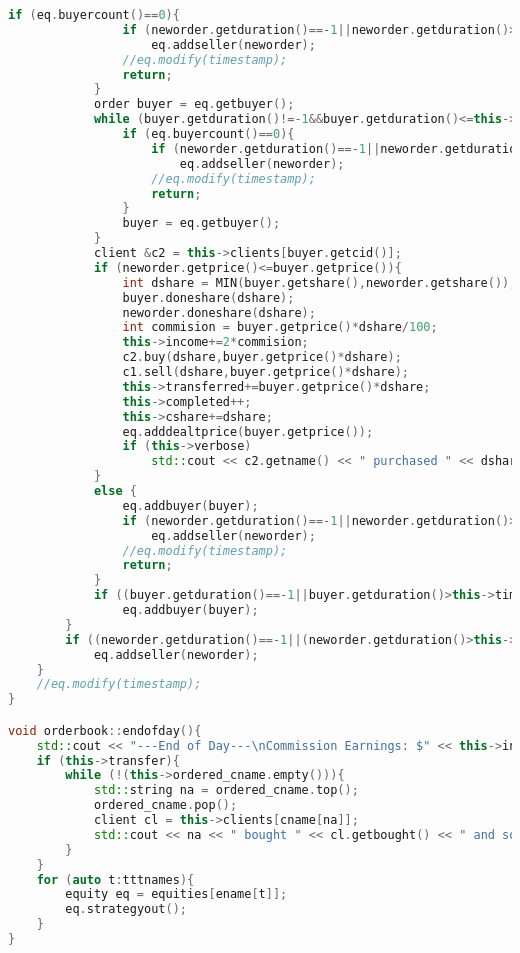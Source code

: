 \documentclass{article}
\begin{document}
\begin{lstlisting}[title=orderbook.cpp,language=C++]
            if (eq.buyercount()==0){
                if (neworder.getduration()==-1||neworder.getduration()>this->timestamp)
                    eq.addseller(neworder);
                //eq.modify(timestamp);
                return;
            }
            order buyer = eq.getbuyer();
            while (buyer.getduration()!=-1&&buyer.getduration()<=this->timestamp) {
                if (eq.buyercount()==0){
                    if (neworder.getduration()==-1||neworder.getduration()>this->timestamp)
                        eq.addseller(neworder);
                    //eq.modify(timestamp);
                    return;
                }
                buyer = eq.getbuyer();
            }
            client &c2 = this->clients[buyer.getcid()];
            if (neworder.getprice()<=buyer.getprice()){
                int dshare = MIN(buyer.getshare(),neworder.getshare());
                buyer.doneshare(dshare);
                neworder.doneshare(dshare);
                int commision = buyer.getprice()*dshare/100;
                this->income+=2*commision;
                c2.buy(dshare,buyer.getprice()*dshare);
                c1.sell(dshare,buyer.getprice()*dshare);
                this->transferred+=buyer.getprice()*dshare;
                this->completed++;
                this->cshare+=dshare;
                eq.adddealtprice(buyer.getprice());
                if (this->verbose)
                    std::cout << c2.getname() << " purchased " << dshare << " shares of " << eq.getname() << " from " << c1.getname() << " for $" << buyer.getprice() << "/share" << std::endl; 
            }
            else {
                eq.addbuyer(buyer);
                if (neworder.getduration()==-1||neworder.getduration()>this->timestamp)
                    eq.addseller(neworder);
                //eq.modify(timestamp);
                return;
            }
            if ((buyer.getduration()==-1||buyer.getduration()>this->timestamp)&&(buyer.getshare()!=0))
                eq.addbuyer(buyer);
        }
        if ((neworder.getduration()==-1||(neworder.getduration()>this->timestamp&&neworder.getduration()!=neworder.getts()))&&(neworder.getshare()!=0))
            eq.addseller(neworder);
    }
    //eq.modify(timestamp);
}

void orderbook::endofday(){
    std::cout << "---End of Day---\nCommission Earnings: $" << this->income << "\nTotal Amount of Money Transferred: $" << this->transferred << "\nNumber of Completed Trades: " << this->completed << "\nNumber of Shares Traded: " << this->cshare << std::endl;
    if (this->transfer){
        while (!(this->ordered_cname.empty())){
            std::string na = ordered_cname.top();
            ordered_cname.pop();
            client cl = this->clients[cname[na]];
            std::cout << na << " bought " << cl.getbought() << " and sold " << cl.getsold() << " for a net transfer of $" << cl.getincome() << std::endl;
        }
    }
    for (auto t:tttnames){
        equity eq = equities[ename[t]];
        eq.strategyout();
    }
}


\end{lstlisting}
\end{document}

